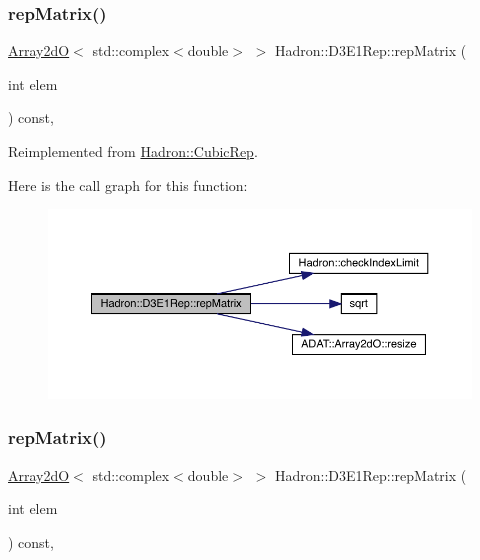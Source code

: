 \subsubsection{\texorpdfstring{repMatrix()}{repMatrix()}\hspace{0.1cm}{\footnotesize\ttfamily [1/2]}}
{\footnotesize\ttfamily \mbox{\hyperlink{classADAT_1_1Array2dO}{Array2dO}}$<$ std\+::complex$<$double$>$ $>$ Hadron\+::\+D3\+E1\+Rep\+::rep\+Matrix (\begin{DoxyParamCaption}\item[{int}]{elem }\end{DoxyParamCaption}) const\hspace{0.3cm}{\ttfamily [inline]}, {\ttfamily [virtual]}}



Reimplemented from \mbox{\hyperlink{structHadron_1_1CubicRep_ac5d7e9e6f4ab1158b5fce3e4ad9e8005}{Hadron\+::\+Cubic\+Rep}}.

Here is the call graph for this function\+:
\nopagebreak
\begin{figure}[H]
\begin{center}
\leavevmode
\includegraphics[width=350pt]{d3/daf/structHadron_1_1D3E1Rep_ac66aebdefbd99d129891c85cbc86b430_cgraph}
\end{center}
\end{figure}
\mbox{\label{structHadron_1_1D3E1Rep_ac66aebdefbd99d129891c85cbc86b430}} 
\subsubsection{\texorpdfstring{repMatrix()}{repMatrix()}\hspace{0.1cm}{\footnotesize\ttfamily [2/2]}}
{\footnotesize\ttfamily \mbox{\hyperlink{classADAT_1_1Array2dO}{Array2dO}}$<$ std\+::complex$<$double$>$ $>$ Hadron\+::\+D3\+E1\+Rep\+::rep\+Matrix (\begin{DoxyParamCaption}\item[{int}]{elem }\end{DoxyParamCaption}) const\hspace{0.3cm}{\ttfamily [inline]}, {\ttfamily [virtual]}}



